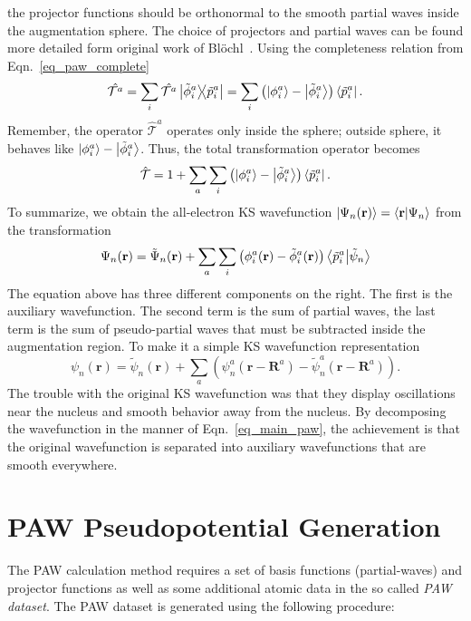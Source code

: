 the projector functions should be orthonormal to the smooth partial waves inside the augmentation sphere. The choice of projectors and partial waves can be found more detailed form original work of Bl\"ochl~\cite{blochl1994projector}. Using the completeness relation from Eqn.~\eqref{eq_paw_complete}
\begin{equation}
\hat{\mathcal{T}^a} = \sum_i \hat{\mathcal{T}^a} \dyad{\tilde{\phi}_i^a}{\tilde{p}_i^a} = \sum_i \left( \ket{\phi_i^a} -\ket{\tilde{\phi}_i^a} \right) \bra{\tilde{p}_i^a}.
\end{equation}
Remember, the operator $\hat{\mathcal{T}}^a$ operates only inside the sphere; outside sphere, it behaves like $\ket{\phi_i^a} - \ket{\tilde{\phi}_i^a}$. Thus, the total transformation operator becomes
\begin{equation}
\hat{\mathcal{T}} = 1 + \sum_a\sum_i\left( \ket{\phi_i^a} -\ket{\tilde{\phi}_i^a} \right) \bra{\tilde{p}_i^a}.
\end{equation}
To summarize, we obtain the all-electron KS wavefunction $\ket{\Psi_n(\mathbf{r})} = \braket{\mathbf{r}}{\Psi_n}$ from the transformation
\begin{equation}
\label{eq_main_paw}
\Psi_n(\mathbf{r}) = \tilde{\Psi}_n(\mathbf{r}) + \sum_a\sum_i \left (\phi_i^a(\mathbf{r}) - \tilde{\phi}_i^a(\mathbf{r})   \right) \braket{\tilde{p}_i^a}{\tilde{\psi}_n}
\end{equation}
The equation above has three different components on the right. The first is the auxiliary wavefunction. The second term is the sum of partial waves, the last term is the sum of pseudo-partial waves that must be subtracted inside the augmentation region. To make it a simple KS wavefunction representation
\begin{equation}
\psi_n(\mathbf{r}) = \tilde{\psi}_n(\mathbf{r}) + \sum_a\left( \psi_n^a(\mathbf{r}-\mathbf{R}^a) - \tilde{\psi}_n^a (\mathbf{r} - \mathbf{R}^a) \right).
\end{equation}
The trouble with the original KS wavefunction was that they display oscillations near the nucleus and smooth behavior away from the nucleus. By decomposing the wavefunction in the manner of Eqn.~\eqref{eq_main_paw}, the achievement is that the original wavefunction is separated into auxiliary wavefunctions that are smooth everywhere.

\clearpage


\section{PAW Pseudopotential Generation}\label{appen_pseudo}
The PAW calculation method requires a set of basis functions (partial-waves) and projector functions as well as some additional atomic data in the so called \textit{PAW dataset}. The PAW dataset is generated using the following procedure:

